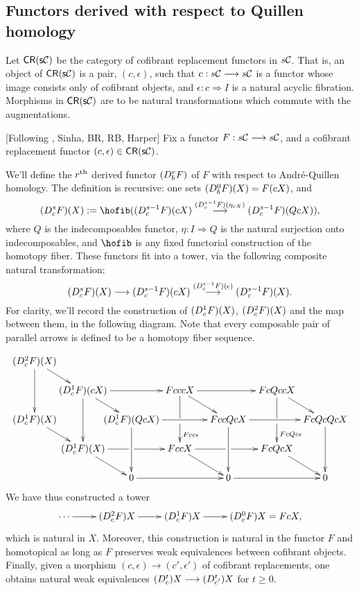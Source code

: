 \documentclass[10pt]{article}
\newcommand{\dupdown}[2]{D^{\smash{#1}}_{\smash{#2}}}
\newcommand{\Comm}{\calC}
\begin{document}
\begin{convergence}
\subsection{Functors derived with respect to Quillen homology}
Let $\mathsf{CR(s\Comm)}$ be the category of cofibrant replacement functors in $s\Comm$. That is, an object of $\mathsf{CR(s\Comm)}$ is a pair, $(c,\epsilon)$, such that $c:s\Comm\to s\Comm$ is a functor whose image consists only of cofibrant objects, and $\epsilon:c\Rightarrow I$ is a natural acyclic fibration. Morphisms in $\mathsf{CR(s\Comm)}$ are to be natural transformations which commute with the augmentations.

[Following \cite{BousKanSSeq.pdf}, Sinha, BR, RB, Harper] Fix a functor $F:s\Comm\to s\Comm$, and a cofibrant replacement functor $(c,\epsilon)\in\mathsf{CR(s\Comm)}$.

We'll define the $r^\textup{th}$ derived functor $(\dupdown{r}{b}F)$ of $F$ with respect to Andr\'e-Quillen homology. The definition is recursive: one sets $(\dupdown{0}{b}F)(X)=F(cX)$, and
\[(\dupdown{s}{c}F)(X):=\hofib((\dupdown{s-1}{c}F)(cX)\overset{(\dupdown{s-1}{c}F)(\eta_{cX})}{\to} (\dupdown{s-1}{c}F)(QcX)),\]
where $Q$ is the indecomposables functor, $\eta:I\Rightarrow Q$ is the natural surjection onto indecomposables, and $\hofib$ is any fixed  functorial construction of the homotopy fiber. These functors fit into a tower, via the following composite natural transformation:
\[(\dupdown{s}{c}F)(X)\to (\dupdown{s-1}{c}F)(cX)\overset{(\dupdown{s-1}{c}F)(\epsilon)}{\to} (\dupdown{s-1}{c}F)(X).\]
For clarity, we'll record the construction of $(\dupdown{1}{c}F)(X)$, $(\dupdown{2}{c}F)(X)$ and the map between them, in the following diagram. Note that every composable pair of  parallel arrows is defined to be a homotopy fiber sequence.


\[\def\labelstyle{\scriptstyle}
\xymatrix@!0@R=30pt@C=50pt{
(\dupdown{2}{c}F)(X)\ar[dr]\ar[dd]\\
&(\dupdown{1}{c}F)(cX) \ar[rr]\ar[rd]\ar[dd]         &           &FcccX \ar[rr]\ar[rd]\ar'[d][dd]^{Fcc\epsilon}         &           &   FcQccX \ar'[d][dd]^{FcQc\epsilon}           \ar[dr]  &                  \\
(\dupdown{1}{c}F)(X)\ar[dr]&        &  (\dupdown{1}{c}F)(QcX) \ar[rr] \ar[dd]  &                     &  FccQcX \ar[rr] \ar[dd]  &             & FcQcQcX
         \ar[dd] \\
&(\dupdown{1}{c}F)(X) \ar'[r][rr] \ar[dr] &        &   FccX \ar'[r][rr] \ar[dr] &        &   FcQcX
\ar[dr] &                   \\
&        &   0 \ar[rr]      &               &   0 \ar[rr]      &                    &
0
}\]
We have thus constructed a tower
\[\xymatrix@R=4mm{
\cdots 
\ar[r]
&%
(\dupdown{2}{c}F)X
\ar[r]
&%
(\dupdown{1}{c}F)X
\ar[r]&%
(\dupdown{0}{c}F)X=FcX,
}\]
which is natural in $X$.
Moreover, this construction is natural in the functor $F$ and homotopical as long as $F$ preserves weak equivalences between cofibrant objects. Finally, given a morphism $(c,\epsilon)\to (c',\epsilon')$ of cofibrant replacements, one obtains natural weak equivalences $(\dupdown{t}{c})X\to(\dupdown{t}{c'})X$ for $t\geq0$.


\end{convergence}
\end{document}
